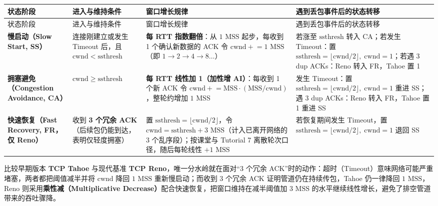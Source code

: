 \begingroup\small\setlength{\tabcolsep}{3pt}\renewcommand{\arraystretch}{1.22}
\begin{longtable}{@{}>{\raggedright\arraybackslash}p{}>{\raggedright\arraybackslash}p{}>{\raggedright\arraybackslash}p{}>{\raggedright\arraybackslash}p{}@{}}
\toprule
状态阶段 & 进入与维持条件 & 窗口增长规律 & 遇到丢包事件后的状态转移 \\
\midrule\endfirsthead
状态阶段 & 进入与维持条件 & 窗口增长规律 & 遇到丢包事件后的状态转移 \\
\midrule\endhead
\bottomrule\endfoot
\textbf{慢启动（Slow Start, SS）} & 连接刚建立或发生 Timeout 后，且 $\mathrm{cwnd} < \mathrm{ssthresh}$ & \textbf{每 RTT 指数翻倍}：从 $1\text{ MSS}$ 起步，每收到 1 个确认新数据的 ACK 令 $\mathrm{cwnd} \mathrel{+}= 1\text{ MSS}$（即 $1 \to 2 \to 4 \to 8\dots$） & 若涨至 $\mathrm{ssthresh}$ 转入 CA；若发生 Timeout：置 $\mathrm{ssthresh}=\lfloor \mathrm{cwnd}/2\rfloor,\; \mathrm{cwnd}=1$；若遇 3 dup ACKs：Reno 转入 FR，Tahoe 置 1 \\
\textbf{拥塞避免（Congestion Avoidance, CA）} & $\mathrm{cwnd} \ge \mathrm{ssthresh}$ & \textbf{每 RTT 线性加 1（加性增 AI）}：每收到 1 个新 ACK 令 $\mathrm{cwnd} \mathrel{+}= \mathrm{MSS}\cdot(\mathrm{MSS}/\mathrm{cwnd})$，整轮约增加 $1\text{ MSS}$ & 发生 Timeout：置 $\mathrm{ssthresh}=\lfloor \mathrm{cwnd}/2\rfloor,\; \mathrm{cwnd}=1$ 重进 SS；遇 3 dup ACKs：Reno 转入 FR，Tahoe 置 1 重进 SS \\
\textbf{快速恢复（Fast Recovery, FR，仅 Reno）} & 收到 \textbf{3 个冗余 ACK}（后续包仍能到达，表明仅轻度拥塞） & 置 $\mathrm{ssthresh}=\lfloor \mathrm{cwnd}/2\rfloor$，令 \textbf{$\mathrm{cwnd} = \mathrm{ssthresh} + 3\text{ MSS}$}（计入已离开网络的 3 个乱序段）；按课堂与 Tutorial 7 离散轮次口径，随后每轮线性 $+1\text{ MSS}$ & 若恢复期间发生 Timeout，置 $\mathrm{ssthresh}=\lfloor \mathrm{cwnd}/2\rfloor,\; \mathrm{cwnd}=1$ 退回 SS \\
\end{longtable}\endgroup

比较早期版本 \textbf{TCP Tahoe} 与现代基准 \textbf{TCP Reno}，唯一分水岭就在面对“3 个冗余 ACK”时的动作：超时（Timeout）意味网络可能严重堵塞，两者都把阈值减半并将 $\mathrm{cwnd}$ 降回 $1\text{ MSS}$ 重新慢启动；而收到 3 个冗余 ACK 证明管道仍在持续传包，Tahoe 仍一律降回 $1\text{ MSS}$，Reno 则采用\textbf{乘性减（Multiplicative Decrease）}配合快速恢复，把窗口维持在减半阈值加 $3\text{ MSS}$ 的水平继续线性增长，避免了排空管道带来的吞吐骤降。

